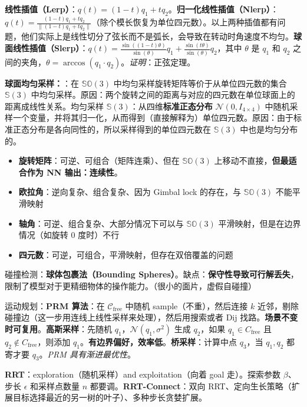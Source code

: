 \documentclass[
  8pt]{extarticle}
\providecommand{\tightlist}{%
  \setlength{\itemsep}{0pt}\setlength{\parskip}{0pt}}
\begin{document}
\begin{multicols*}{4}
\textbf{线性插值（Lerp）}：\(q(t) = (1-t)q_1 + tq_2\)。\textbf{归一化线性插值（Nlerp）}：\(q(t) = \frac{(1-t)q_1 + tq_2}{\|(1-t)q_1 + tq_2\|}\)（除个模长恢复为单位四元数）。以上两种插值都有问题，他们实际上是线性切分了弦长而不是弧长，会导致在转动时角速度不均匀。\textbf{球面线性插值（Slerp）}：\(q(t) = \frac{\sin((1-t)\theta)}{\sin(\theta)} q_1 + \frac{\sin(t\theta)}{\sin(\theta)} q_2\)，其中
\(\theta\) 是 \(q_1\) 和 \(q_2\)
之间的夹角，\(\theta = \arccos(q_1 \cdot q_2)\)。\emph{证明}：正弦定理。

\textbf{球面均匀采样：}：在 \(\mathbb{SO}(3)\)
中均匀采样旋转矩阵等价于从单位四元数的集合 \(\mathbb{S}(3)\)
中均匀采样。原因：两个旋转之间的距离与对应的四元数在单位球面上的距离成线性关系。均匀采样
\(\mathbb{S}(3)\)：从四维\textbf{标准正态分布}
\(\mathcal{N}(0, I_{4 \times 4})\)
中随机采样一个变量，并将其归一化，从而得到（直接解释为）单位四元数。原因：由于标准正态分布是各向同性的，所以采样得到的单位四元数在
\(\mathbb{S}(3)\) 中也是均匀分布的。

\begin{itemize}
\tightlist
\item
  \textbf{旋转矩阵}：可逆、可组合（矩阵连乘）、但在 \(\mathbb{SO}(3)\)
  上移动不直接，\textbf{但最适合作为 NN 输出：连续性}。
\item
  \textbf{欧拉角}：逆向复杂、组合复杂、因为 Gimbal lock 的存在，与
  \(\mathbb{SO}(3)\) 不能平滑映射
\item
  \textbf{轴角}：可逆、组合复杂、大部分情况下可以与 \(\mathbb{SO}(3)\)
  平滑映射，但是在边界情况（如旋转 \(0\) 度时）不行
\item
  \textbf{四元数}：可逆，可组合，平滑映射，但存在双倍覆盖的问题
\end{itemize}

碰撞检测：\textbf{球体包裹法（Bounding
Spheres）}。缺点：\textbf{保守性导致可行解丢失}，限制了模型对于更精细物体的操作能力。（很小的面片，虚假自碰撞）

运动规划：\textbf{PRM 算法}：在 \(\mathcal{C}_{\text{free}}\) 中随机
sample（不重），然后连接 \(k\)
近邻，剔除碰撞边（这一步用连线上线性采样来处理），然后用搜索或者 Dij
找路。\textbf{场景不变时可复用}。\textbf{高斯采样}：先随机
\(q_1\)，\(\mathcal N (q_1, \sigma^2)\) 生成 \(q_2\)，如果
\(q_1 \in C_{\text{free}}\) 且 \(q_2 \notin C_{\text{free}}\)，则添加
\(q_1\)。\textbf{有边界偏好，效率低}。\textbf{桥采样}：计算中点
\(q_3\)，当 \(q_1,q_2\) 都寄才要 \(q_3\)。\emph{PRM 具有渐进最优性}。

\textbf{RRT}：exploration（随机采样）and exploitation（向着 goal
走）。探索参数 \(\beta\)、步长 \(\epsilon\) 和采样点数量 \(n\)
都要调。\textbf{RRT-Connect}：双向
RRT、定向生长策略（扩展目标选择最近的另一树的叶子）、多种步长贪婪扩展。


\end{multicols*}
\end{document}
